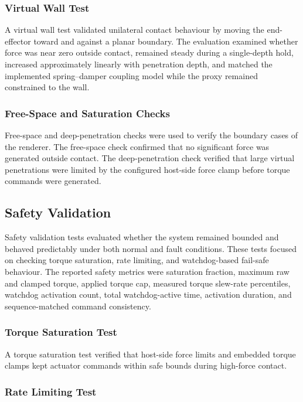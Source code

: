 \subsubsection{Virtual Wall Test}

A virtual wall test validated unilateral contact behaviour by moving the end-effector toward and against a planar boundary. The evaluation examined whether force was near zero outside contact, remained steady during a single-depth hold, increased approximately linearly with penetration depth, and matched the implemented spring--damper coupling model while the proxy remained constrained to the wall.

\subsubsection{Free-Space and Saturation Checks}

Free-space and deep-penetration checks were used to verify the boundary cases of the renderer. The free-space check confirmed that no significant force was generated outside contact. The deep-penetration check verified that large virtual penetrations were limited by the configured host-side force clamp before torque commands were generated.

\subsection{Safety Validation}

Safety validation tests evaluated whether the system remained bounded and behaved predictably under both normal and fault conditions. These tests focused on checking torque saturation, rate limiting, and watchdog-based fail-safe behaviour.
The reported safety metrics were saturation fraction, maximum raw and clamped torque, applied torque cap, measured torque slew-rate percentiles, watchdog activation count, total watchdog-active time, activation duration, and sequence-matched command consistency.

\subsubsection{Torque Saturation Test}

A torque saturation test verified that host-side force limits and embedded torque clamps kept actuator commands within safe bounds during high-force contact.

\subsubsection{Rate Limiting Test}

